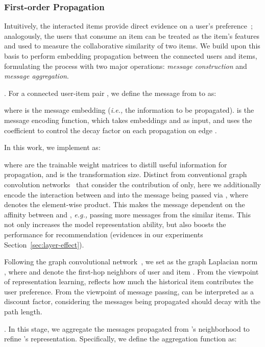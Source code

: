 \documentclass[sigconf]{acmart}
\newcommand{\ie}{\emph{i.e., }}
\newcommand{\eg}{\emph{e.g., }}
\theoremstyle{definition}
\begin{document}
\subsubsection{\textbf{First-order Propagation}}
Intuitively, the interacted items provide direct evidence on a user's preference~\cite{DeepICF,FISM};
analogously, the users that consume an item can be treated as the item's features and used to measure the collaborative similarity of two items.
We build upon this basis to perform embedding propagation between the connected users and items, formulating the process with two major operations: \emph{message construction} and \emph{message aggregation}. 

\vspace{+5pt}
.
For a connected user-item pair , we define the message from  to  as:

where  is the message embedding (\ie the information to be propagated).  is the message encoding function, which takes embeddings  and  as input, and uses the coefficient  to control the decay factor on each propagation on edge .

In this work, we implement  as:

where  are the trainable weight matrices to distill useful information for propagation, and  is the transformation size.
Distinct from conventional graph convolution networks~\cite{FirstGCN,GCN,PinSage,GC-MC} that consider the contribution of  only, here we additionally encode the interaction between  and  into the message being passed via , where  denotes the element-wise product.
This makes the message dependent on the affinity between  and , \eg passing more messages from the similar items. This not only increases the model representation ability,
but also boosts the performance for recommendation (evidences in our experiments Section~\ref{sec:layer-effect}). 

Following the graph convolutional network~\cite{GCN}, we set  as the graph Laplacian norm , where  and  denote the first-hop neighbors of user  and item .
From the viewpoint of representation learning,  reflects how much the historical item contributes the user preference.
From the viewpoint of message passing,  can be interpreted as a discount factor, considering the messages being propagated should decay with the path length.



\vspace{+5pt}
. In this stage, we aggregate the messages propagated from 's neighborhood to refine 's representation.
Specifically, we define the aggregation function as:
\end{document}
